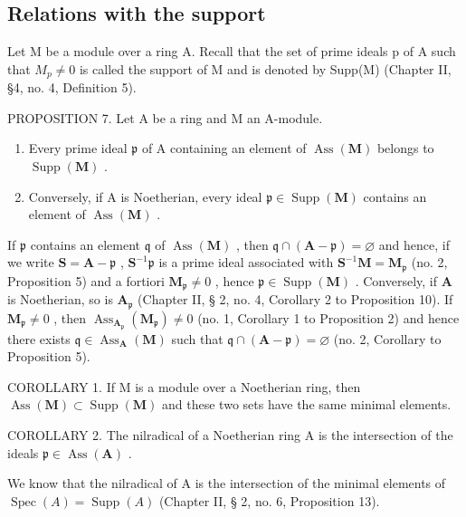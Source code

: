 \subsection{Relations with the support}

Let M be a module over a ring A. Recall that the set of prime ideals p of A such that \(M_{p} \neq 0\) is called the support of M and is denoted by Supp(M) (Chapter II, §4, no. 4, Definition 5).

PROPOSITION 7. Let A be a ring and M an A-module.

\begin{enumerate}
\def\labelenumi{(\roman{enumi})}
\item
  Every prime ideal \(\mathfrak{p}\) of A containing an element of \(\operatorname{Ass}(\mathbf{M})\) belongs to \(\operatorname{Supp}(\mathbf{M})\) .
\item
  Conversely, if A is Noetherian, every ideal \(\mathfrak{p} \in \operatorname{Supp}(\mathbf{M})\) contains an element of \(\operatorname{Ass}(\mathbf{M})\) .
\end{enumerate}

If \(\mathfrak{p}\) contains an element \(\mathfrak{q}\) of \(\operatorname{Ass}(\mathbf{M})\) , then \(\mathfrak{q} \cap (\mathbf{A} - \mathfrak{p}) = \varnothing\) and hence, if we write \(\mathbf{S} = \mathbf{A} - \mathfrak{p}\) , \(\mathbf{S}^{-1}\mathfrak{p}\) is a prime ideal associated with \(\mathbf{S}^{-1}\mathbf{M} = \mathbf{M}_{\mathfrak{p}}\) (no. 2, Proposition 5) and a fortiori \(\mathbf{M}_{\mathfrak{p}} \neq 0\) , hence \(\mathfrak{p} \in \operatorname{Supp}(\mathbf{M})\) . Conversely, if \(\mathbf{A}\) is Noetherian, so is \(\mathbf{A}_{\mathfrak{p}}\) (Chapter II, § 2, no. 4, Corollary 2 to Proposition 10). If \(\mathbf{M}_{\mathfrak{p}} \neq 0\) , then \(\operatorname{Ass}_{\mathbf{A}_{\mathfrak{p}}}(\mathbf{M}_{\mathfrak{p}}) \neq 0\) (no. 1, Corollary 1 to Proposition 2) and hence there exists \(\mathfrak{q} \in \operatorname{Ass}_{\mathbf{A}}(\mathbf{M})\) such that \(\mathfrak{q} \cap (\mathbf{A} - \mathfrak{p}) = \varnothing\) (no. 2, Corollary to Proposition 5).

COROLLARY 1. If M is a module over a Noetherian ring, then \(\operatorname{Ass}(\mathbf{M}) \subset \operatorname{Supp}(\mathbf{M})\) and these two sets have the same minimal elements.

COROLLARY 2. The nilradical of a Noetherian ring A is the intersection of the ideals \(\mathfrak{p} \in \operatorname{Ass}(\mathbf{A})\) .

We know that the nilradical of A is the intersection of the minimal elements of \(\operatorname{Spec}(A) = \operatorname{Supp}(A)\) (Chapter II, § 2, no. 6, Proposition 13).

